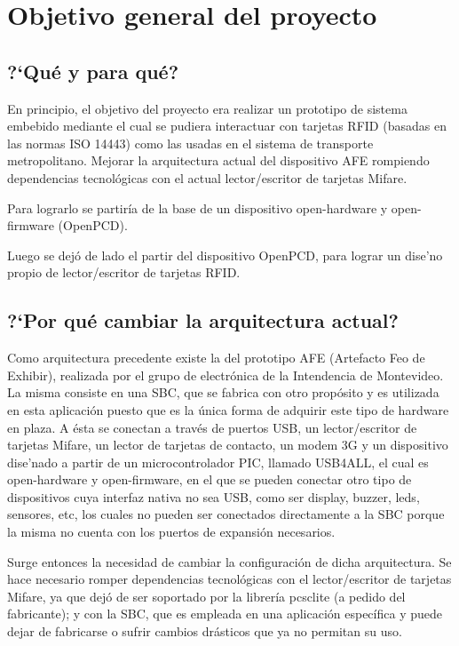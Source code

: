 \chapter{Objetivo general del proyecto}

\section{?`Qu\'e y para qu\'e?}

En principio, el objetivo del proyecto era realizar un prototipo de sistema embebido mediante el cual se pudiera interactuar con tarjetas RFID (basadas en las normas ISO 14443) como las usadas en el sistema de transporte metropolitano.
Mejorar la arquitectura actual del dispositivo AFE rompiendo dependencias tecnol\'ogicas con el actual lector/escritor de tarjetas Mifare.

Para lograrlo se partir\'ia de la base de un dispositivo open-hardware y open-firmware (OpenPCD).

Luego se dej\'o de lado el partir del dispositivo OpenPCD, para lograr un dise'no propio de lector/escritor de tarjetas RFID.

\section{?`Por qu\'e cambiar la arquitectura actual?}

Como arquitectura precedente existe la del prototipo AFE (Artefacto Feo de Exhibir), realizada por el grupo de electr\'onica de la Intendencia de Montevideo. La misma consiste en una SBC, que se fabrica con otro prop\'osito y es utilizada en esta aplicaci\'on puesto que es la \'unica forma de adquirir este tipo de hardware en plaza. A \'esta se conectan a trav\'es de puertos USB, un lector/escritor de tarjetas Mifare, un lector de tarjetas de contacto, un modem 3G y un dispositivo dise'nado a partir de un microcontrolador PIC, llamado USB4ALL, el cual es open-hardware y open-firmware, en el que se pueden conectar otro tipo de dispositivos cuya interfaz nativa no sea USB, como ser display, buzzer, leds, sensores, etc, los cuales no pueden ser conectados directamente a la SBC porque la misma no cuenta con los puertos de expansi\'on necesarios.

Surge entonces la necesidad de cambiar la configuraci\'on de dicha arquitectura. Se hace necesario romper dependencias tecnol\'ogicas con el lector/escritor de tarjetas Mifare, ya que dej\'o de ser soportado por la librer\'ia pcsclite (a pedido del fabricante); y con la SBC, que es empleada en una aplicaci\'on espec\'ifica y puede dejar de fabricarse o sufrir cambios dr\'asticos que ya no permitan su uso.


